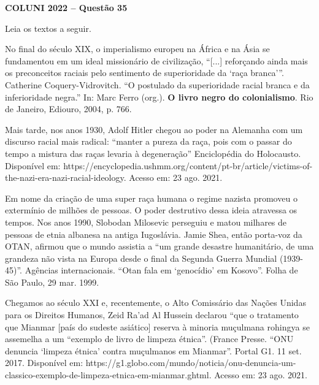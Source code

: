 \textbf{COLUNI 2022 -- Questão 35}\par\medskip Leia os textos a seguir.

\par

No final do século XIX, o imperialismo europeu na África e na Ásia se fundamentou em um ideal missionário de civilização, “[...] reforçando ainda mais os preconceitos raciais pelo sentimento de superioridade da ‘raça branca’”. Catherine Coquery-Vidrovitch. “O postulado da superioridade racial branca e da inferioridade negra.” In: Marc Ferro (org.). \textbf{O livro negro do colonialismo}. Rio de Janeiro, Ediouro, 2004, p. 766.

\par

Mais tarde, nos anos 1930, Adolf Hitler chegou ao poder na Alemanha com um discurso racial mais radical: “manter a pureza da raça, pois com o passar do tempo a mistura das raças levaria à degeneração” Enciclopédia do Holocausto. Disponível em: https://encyclopedia.ushmm.org/content/pt-br/article/victims-of-the-nazi-era-nazi-racial-ideology. Acesso em: 23 ago. 2021.

\par

Em nome da criação de uma super raça humana o regime nazista promoveu o extermínio de milhões de pessoas. O poder destrutivo dessa ideia atravessa os tempos. Nos anos 1990, Slobodan Milosevic perseguiu e matou milhares de pessoas de etnia albanesa na antiga Iugoslávia. Jamie Shea, então porta-voz da OTAN, afirmou que o mundo assistia a “um grande desastre humanitário, de uma grandeza não vista na Europa desde o final da Segunda Guerra Mundial (1939-45)”. Agências internacionais. “Otan fala em ‘genocídio’ em Kosovo”. Folha de São Paulo, 29 mar. 1999.

\par

Chegamos ao século XXI e, recentemente, o Alto Comissário das Nações Unidas para os Direitos Humanos, Zeid Ra'ad Al Hussein declarou “que o tratamento que Mianmar [país do sudeste asiático] reserva à minoria muçulmana rohingya se assemelha a um “exemplo de livro de limpeza étnica”. (France Presse. “ONU denuncia ‘limpeza étnica’ contra muçulmanos em Mianmar”. Portal G1. 11 set. 2017. Disponível em: https://g1.globo.com/mundo/noticia/onu-denuncia-um-classico-exemplo-de-limpeza-etnica-em-mianmar.ghtml. Acesso em: 23 ago. 2021.

\par

